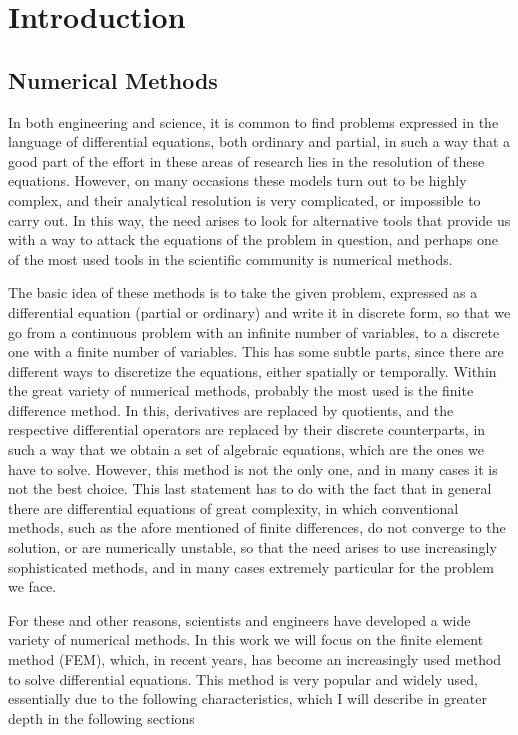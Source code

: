 \chapter{Introduction}

\section{Numerical Methods}
In both engineering and science, it is common to find problems expressed in the language of differential equations, both ordinary and partial, in such a way that a good part of the effort in these areas of research lies in the resolution of these equations. However, on many occasions these models turn out to be highly complex, and their analytical resolution is very complicated, or impossible to carry out. In this way, the need arises to look for alternative tools that provide us with a way to attack the equations of the problem in question, and perhaps one of the most used tools in the scientific community is numerical methods.

The basic idea of these methods is to take the given problem, expressed as a differential equation (partial or ordinary) and write it in discrete form, so that we go from a continuous problem with an infinite number of variables, to a discrete one with a finite number of variables. This has some subtle parts, since there are different ways to discretize the equations, either spatially or temporally. Within the great variety of numerical methods, probably the most used is the finite difference method. In this, derivatives are replaced by quotients, and the respective differential operators are replaced by their discrete counterparts, in such a way that we obtain a set of algebraic equations, which are the ones we have to solve. However, this method is not the only one, and in many cases it is not the best choice. This last statement has to do with the fact that in general there are differential equations of great complexity, in which conventional methods, such as the afore mentioned of finite differences, do not converge to the solution, or are numerically unstable, so that the need arises to use increasingly sophisticated methods, and in many cases extremely particular for the problem we face.

For these and other reasons, scientists and engineers have developed a wide variety of numerical methods. In this work we will focus on the finite element method (FEM), which, in recent years, has become an increasingly used method to solve differential equations. This method is very popular and widely used, essentially due to the following characteristics, which I will describe in greater depth in the following sections \cite{Johnson2012}



